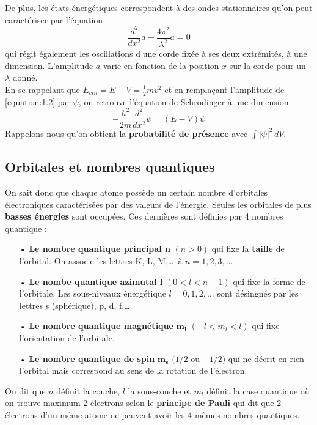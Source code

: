 	\noindent De plus, les états énergétiques correspondent à des ondes stationnaires qu'on peut caractériser par l'équation 
	\begin{equation}
	\frac{d^2}{dx^2}a + \frac{4\pi ^2}{\lambda ^2}a = 0
	\label{equation:1.2}
	\end{equation}	 
	qui régit également les oscillations d'une corde fixée à ses deux extrémités, à une dimension. L'amplitude $a$ varie en fonction de la position $x$ sur la corde pour un $\lambda$ donné. \\
	En se rappelant que $E_{cin} = E-V = \frac{1}{2}mv^2$ et en remplaçant l'amplitude de \eqref{equation:1.2} par $\psi$, on retrouve l'équation de Schrödinger à une dimension 
	\begin{equation}
	-\frac{\hbar ^2}{2m}\frac{d^2}{dx^2}\psi = (E-V)\psi
	\end{equation}
	Rappelons-nous qu'on obtient la \textbf{probabilité de présence} avec $\int |\psi| ^2 \, dV.$
	
\subsection{Orbitales et nombres quantiques}
	\noindent On sait donc que chaque atome possède un certain nombre d'orbitales électroniques caractérisées par des valeurs de l'énergie. Seules les orbitales de plus \textbf{basses énergies} sont occupées. Ces dernières sont définies par 4 nombres quantique :\\
	\begin{itemize}
	\item[•] \textbf{Le nombre quantique principal n} $(n>0)$ qui fixe la \textbf{taille} de l'orbital. On associe les lettres K, L, M,\dots \ à $n=1,2,3, \dots$
	\item[•] \textbf{Le nombe quantique azimutal l} $(0<l<n-1)$ qui fixe la forme de l'orbitale. Les sous-niveaux énergétique $l = 0,1,2, \dots$ sont désingnés par les lettres s (sphérique), p, d, f,\dots
	\item[•] \textbf{Le nombre quantique magnétique } $\mathbf{m_l}$ $(-l <m_l<l)$ qui fixe l'orientation de l'orbitale. 
	\item[•] \textbf{Le nombre quantique de spin} $\mathbf{ m_s}$ $(1/2$ ou $-1/2)$ qui ne décrit en rien l'orbital mais correspond au sens de la rotation de l'électron. \\
	\end{itemize}
	On dit que $n$ définit la couche, $l$ la sous-couche et $m_l$ définit la case quantique où on trouve maximum 2 électrons selon le \textbf{principe de Pauli} qui dit que 2 électrons d'un même atome ne peuvent avoir les 4 mêmes nombres quantiques. 
	

